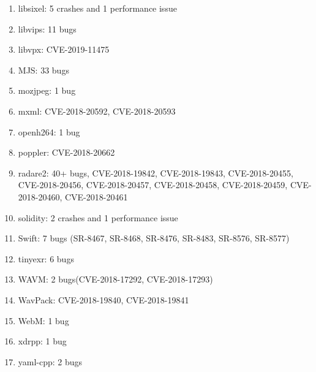 \documentclass[paper=a4,fontsize=11pt]{article} %
\begin{document}
\begin{enumerate}
    \item libsixel: 5 crashes and 1 performance issue
    \item libvips: 11 bugs
    \item libvpx: CVE-2019-11475
    \item MJS: 33 bugs
    \item mozjpeg: 1 bug
    \item mxml: CVE-2018-20592, CVE-2018-20593
    \item openh264: 1 bug
    \item poppler: CVE-2018-20662
    \item radare2: 40+ bugs, CVE-2018-19842, CVE-2018-19843, CVE-2018-20455, CVE-2018-20456, CVE-2018-20457, CVE-2018-20458, CVE-2018-20459, CVE-2018-20460, CVE-2018-20461
    \item solidity: 2 crashes and 1 performance issue
    \item Swift: 7 bugs (SR-8467, SR-8468, SR-8476, SR-8483, SR-8576, SR-8577)
    \item tinyexr: 6 bugs
    \item WAVM: 2 bugs(CVE-2018-17292, CVE-2018-17293)
    \item WavPack: CVE-2018-19840, CVE-2018-19841
    \item WebM: 1 bug
    \item xdrpp: 1 bug
    \item yaml-cpp: 2 bugs
\end{enumerate}


 

\end{document}
